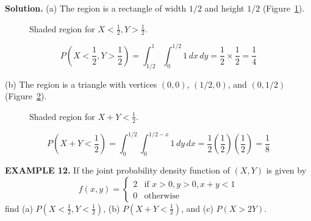 \documentclass{article}
\begin{document}
\textbf{Solution.}
(a) The region is a rectangle of width $1/2$ and height $1/2$ (Figure~\ref{fig:ex11a}).
\begin{figure}[H]
\centering
{}
\caption{Shaded region for $X<\frac{1}{2}, Y>\frac{1}{2}$.}
\label{fig:ex11a}
\end{figure}
$$P\left(X < \frac{1}{2}, Y > \frac{1}{2}\right) = \int_{1/2}^{1} \int_{0}^{1/2} 1 \,dx \,dy = \frac{1}{2} \times \frac{1}{2} = \frac{1}{4}$$

(b) The region is a triangle with vertices $(0,0)$, $(1/2,0)$, and $(0,1/2)$ (Figure~\ref{fig:ex11b}).
\begin{figure}[H]
\centering
{}
\caption{Shaded region for $X+Y<\frac{1}{2}$.}
\label{fig:ex11b}
\end{figure}
$$P\left(X +Y < \frac{1}{2}\right) = \int_{0}^{1/2} \int_{0}^{1/2-x} 1 \,dy \,dx = \frac{1}{2} \left(\frac{1}{2}\right) \left(\frac{1}{2}\right) = \frac{1}{8}$$

\vspace{1em}

\textbf{EXAMPLE 12.} If the joint probability density function of $(X,Y)$ is given by
$$
f(x,y) = \begin{cases} 2 & \text{if } x > 0, y > 0, x+y < 1 \\ 0 & \text{otherwise} \end{cases}
$$
find (a) $P(X < \frac{1}{2}, Y < \frac{1}{2})$, (b) $P(X +Y < \frac{1}{2})$, and (c) $P(X > 2Y)$.
\end{document}
